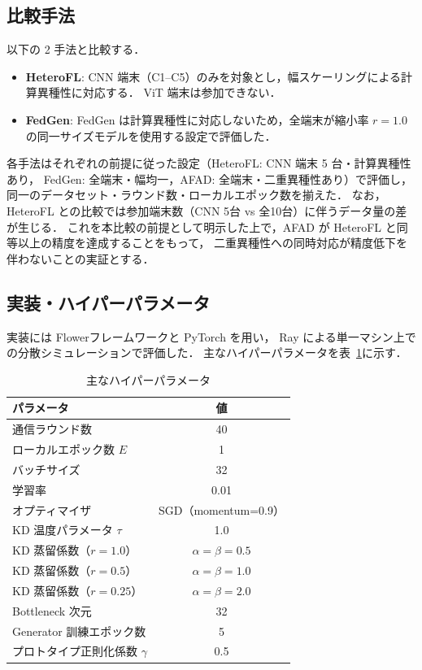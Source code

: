\documentclass[Japanese,noauthor]{dicomopapers}
\begin{document}
\subsection{比較手法}

以下の 2 手法と比較する．

\begin{itemize}
  \item \textbf{HeteroFL}\cite{HeteroFL}:
        CNN 端末（C1–C5）のみを対象とし，幅スケーリングによる計算異種性に対応する．
        ViT 端末は参加できない．

  \item \textbf{FedGen}\cite{FedGen}:
        FedGen は計算異種性に対応しないため，全端末が縮小率 $r = 1.0$
        の同一サイズモデルを使用する設定で評価した．
\end{itemize}

各手法はそれぞれの前提に従った設定（HeteroFL: CNN 端末 5 台・計算異種性あり，
FedGen: 全端末・幅均一，AFAD: 全端末・二重異種性あり）で評価し，
同一のデータセット・ラウンド数・ローカルエポック数を揃えた．
なお，HeteroFL との比較では参加端末数（CNN 5台 vs 全10台）に伴うデータ量の差が生じる．
これを本比較の前提として明示した上で，AFAD が HeteroFL と同等以上の精度を達成することをもって，
二重異種性への同時対応が精度低下を伴わないことの実証とする．

\subsection{実装・ハイパーパラメータ}

実装には Flower\cite{Flower}フレームワークと PyTorch を用い，
Ray による単一マシン上での分散シミュレーションで評価した．
主なハイパーパラメータを表~\ref{tab:hyperparams}に示す．

\begin{table}[htb]
  \centering
  \caption{主なハイパーパラメータ}
  \label{tab:hyperparams}
  \begin{tabular}{lc}
    \toprule
    パラメータ & 値 \\
    \midrule
    通信ラウンド数 & 40 \\
    ローカルエポック数 $E$ & 1 \\
    バッチサイズ & 32 \\
    学習率 & 0.01 \\
    オプティマイザ & SGD（momentum=0.9）\\
    KD 温度パラメータ $\tau$ & 1.0 \\
    KD 蒸留係数（$r=1.0$）& $\alpha = \beta = 0.5$ \\
    KD 蒸留係数（$r=0.5$）& $\alpha = \beta = 1.0$ \\
    KD 蒸留係数（$r=0.25$）& $\alpha = \beta = 2.0$ \\
    Bottleneck 次元 & 32 \\
    Generator 訓練エポック数 & 5 \\
    プロトタイプ正則化係数 $\gamma$ & 0.5 \\
    \bottomrule
  \end{tabular}
\end{table}
\end{document}
